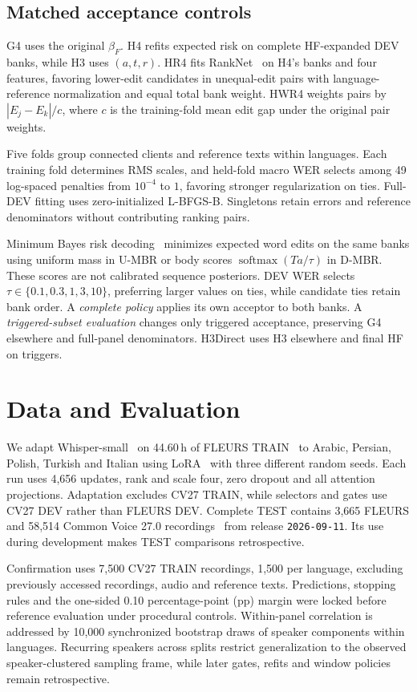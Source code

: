 \documentclass[conference,letterpaper]{IEEEtran}
\begin{document}
\subsection{Matched acceptance controls}
G4 uses the original $\beta_F$. H4 refits expected risk on complete HF-expanded DEV banks, while H3 uses $(a,t,r)$. HR4 fits RankNet~\cite{ranknet2005} on H4's banks and four features, favoring lower-edit candidates in unequal-edit pairs with language-reference normalization and equal total bank weight. HWR4 weights pairs by $|E_j-E_k|/c$, where $c$ is the training-fold mean edit gap under the original pair weights.

Five folds group connected clients and reference texts within languages. Each training fold determines RMS scales, and held-fold macro WER selects among 49 log-spaced penalties from $10^{-4}$ to $1$, favoring stronger regularization on ties. Full-DEV fitting uses zero-initialized L-BFGS-B. Singletons retain errors and reference denominators without contributing ranking pairs.

Minimum Bayes risk decoding~\cite{goel2000mbr} minimizes expected word edits on the same banks using uniform mass in U-MBR or body scores $\operatorname{softmax}(Ta/\tau)$ in D-MBR. These scores are not calibrated sequence posteriors. DEV WER selects $\tau\in\{0.1,0.3,1,3,10\}$, preferring larger values on ties, while candidate ties retain bank order. A \emph{complete policy} applies its own acceptor to both banks. A \emph{triggered-subset evaluation} changes only triggered acceptance, preserving G4 elsewhere and full-panel denominators. H3Direct uses H3 elsewhere and final HF on triggers.

\section{Data and Evaluation}
We adapt Whisper-small~\cite{whisper} on 44.60\,h of FLEURS TRAIN~\cite{fleurs} to Arabic, Persian, Polish, Turkish and Italian using LoRA~\cite{lora} with three different random seeds. Each run uses 4,656 updates, rank and scale four, zero dropout and all attention projections. Adaptation excludes CV27 TRAIN, while selectors and gates use CV27 DEV rather than FLEURS DEV. Complete TEST contains 3,665 FLEURS and 58,514 Common Voice 27.0 recordings~\cite{cv2020} from release \texttt{2026-09-11}. Its use during development makes TEST comparisons retrospective.

Confirmation uses 7,500 CV27 TRAIN recordings, 1,500 per language, excluding previously accessed recordings, audio and reference texts. Predictions, stopping rules and the one-sided 0.10 percentage-point (pp) margin were locked before reference evaluation under procedural controls. Within-panel correlation is addressed by 10,000 synchronized bootstrap draws of speaker components within languages. Recurring speakers across splits restrict generalization to the observed speaker-clustered sampling frame, while later gates, refits and window policies remain retrospective.
\end{document}
